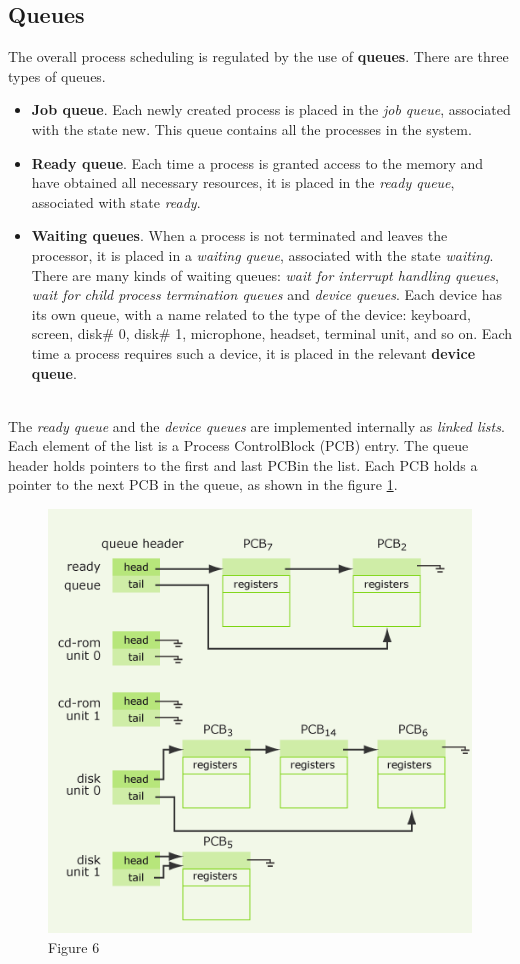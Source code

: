 \documentclass[11pt,a4paper]{scrreprt}
\begin{document}
\subsection{Queues}
The overall process scheduling is regulated by the use of \textbf{queues}. There are three types of queues.
\begin{itemize}
\item \textbf{Job queue}. Each newly created process is placed in the \textit{job queue}, associated with the state new. This queue contains all the processes in the system.
\item \textbf{Ready queue}. Each time a process is granted access to the memory and have obtained all necessary resources, it is placed in the \textit{ready queue}, associated with state \textit{ready}.
\item \textbf{Waiting queues}. When a process is not terminated and leaves the processor, it is placed in a \textit{waiting queue}, associated with the state \textit{waiting}. There are many kinds of waiting queues: \textit{wait for interrupt handling queues}, \textit{wait for child process termination queues} and \textit{device queues}. Each device has its own queue, with a name related to the type of the device: keyboard, screen, disk\# 0, disk\# 1, microphone, headset, terminal unit, and so on. Each time a process requires such a device, it is placed in the relevant \textbf{device queue}. \\\\
\end{itemize}
The \textit{ready queue} and the \textit{device queues} are implemented internally as \textit{linked lists}. Each element of the list is a Process ControlBlock (PCB) entry. The queue header holds pointers to the first and last PCBin the list. Each PCB holds a pointer to the next PCB in the queue, as shown in the figure \ref{fig:figure6}.
\begin{figure}[!ht]
\centering
\includegraphics[width=0.7\linewidth]{img/Fig6.png}
\caption{Figure 6}
\label{fig:figure6}
\end{figure} \newpage
\end{document}
